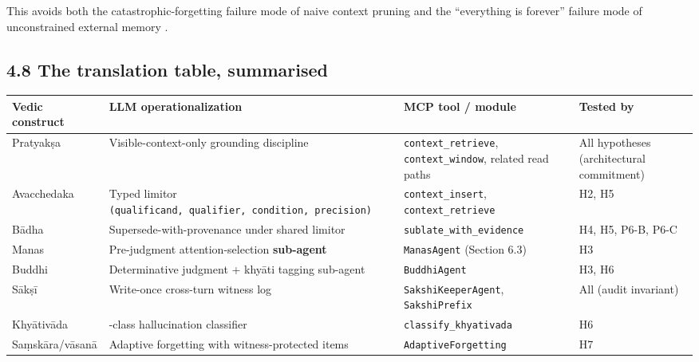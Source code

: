 This avoids both the catastrophic-forgetting failure mode of naive context pruning \citep{french1999catastrophic, kirkpatrick2017overcoming, parisi2019continual} and the ``everything is forever'' failure mode of unconstrained external memory \citep{packer2023memgpt}.

\subsection{4.8 The translation table, summarised}\label{the-translation-table-summarised}

{\def\LTcaptype{none} %
\begin{longtable}[]{@{}
  >{\raggedright\arraybackslash}p{}
  >{\raggedright\arraybackslash}p{}
  >{\raggedright\arraybackslash}p{}
  >{\raggedright\arraybackslash}p{}@{}}
\toprule\noalign{}
\begin{minipage}[b]{\linewidth}\raggedright
Vedic construct
\end{minipage} & \begin{minipage}[b]{\linewidth}\raggedright
LLM operationalization
\end{minipage} & \begin{minipage}[b]{\linewidth}\raggedright
MCP tool / module
\end{minipage} & \begin{minipage}[b]{\linewidth}\raggedright
Tested by
\end{minipage} \\
\midrule\noalign{}
\endhead
\bottomrule\noalign{}
\endlastfoot
Pratyakṣa & Visible-context-only grounding discipline & \texttt{context\_retrieve}, \texttt{context\_window}, related read paths & All hypotheses (architectural commitment) \\
Avacchedaka & Typed limitor \texttt{(qualificand,\ qualifier,\ condition,\ precision)} & \texttt{context\_insert}, \texttt{context\_retrieve} & H2, H5 \\
Bādha & Supersede-with-provenance under shared limitor & \texttt{sublate\_with\_evidence} & H4, H5, P6-B, P6-C \\
Manas & Pre-judgment attention-selection \textbf{sub-agent} & \texttt{ManasAgent} (Section 6.3) & H3 \\
Buddhi & Determinative judgment + khyāti tagging sub-agent & \texttt{BuddhiAgent} & H3, H6 \\
Sākṣī & Write-once cross-turn witness log & \texttt{SakshiKeeperAgent}, \texttt{SakshiPrefix} & All (audit invariant) \\
Khyātivāda & 6-class hallucination classifier & \texttt{classify\_khyativada} & H6 \\
Saṃskāra/vāsanā & Adaptive forgetting with witness-protected items & \texttt{AdaptiveForgetting} & H7 \\
\end{longtable}
}


